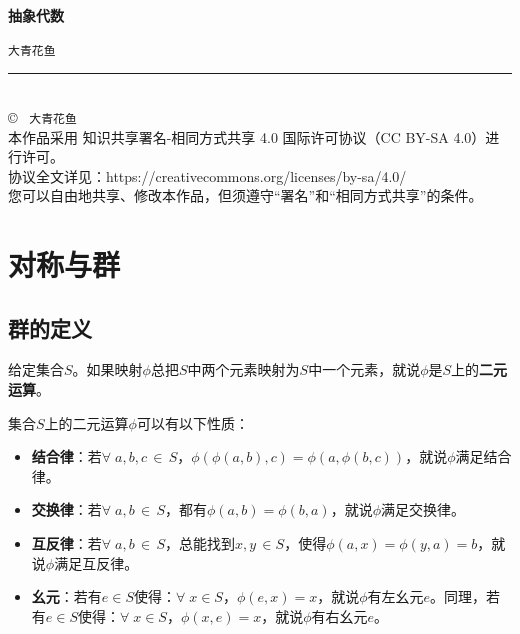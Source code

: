 \documentclass[12pt,UTF8,fontset=none]{ctexbook}
\newcommand{\mytitle}{抽象代数}
\newcommand{\myauthor}{大青花鱼}
\begin{document}
\cleardoublepage                %
\thispagestyle{empty}           %
\begin{center}
    \vspace*{2cm}               %
    
    { \bfseries \mytitle}
    
    \vspace{1cm}              %
    
    { \texttt{\myauthor}}
    
    \vfill                      %
    
    \rule{0.5\textwidth}{0.4pt} \\[0.5cm]
    
    {\scriptsize
    \copyright\ \the\year{} \texttt{\myauthor} \\[0.2cm]
    本作品采用 知识共享署名-相同方式共享 4.0 国际许可协议（CC BY-SA 4.0）进行许可。\\
    协议全文详见：https://creativecommons.org/licenses/by-sa/4.0/ \\
    您可以自由地共享、修改本作品，但须遵守“署名”和“相同方式共享”的条件。
    }
\end{center}
\newpage   

\tableofcontents
\newpage

\chapter{对称与群}

\section{群的定义}

\begin{df}
    给定集合$S$。如果映射$\phi$总把$S$中两个元素映射为$S$中一个元素，就说$\phi$是$S$上的\textbf{二元运算}。
\end{df}

\begin{df}
    集合$S$上的二元运算$\phi$可以有以下性质：
    \begin{itemize}
        \item \textbf{结合律}：若$\forall\; a, b, c\, \in\, S$，$\phi(\phi(a,b),c) = \phi(a,\phi(b,c))$，就说$\phi$满足结合律。
        \item \textbf{交换律}：若$\forall\; a, b\, \in\, S$，都有$\phi(a,b) = \phi(b,a)$，就说$\phi$满足交换律。
        \item \textbf{互反律}：若$\forall\; a, b\, \in\, S$，总能找到$x, y\, \in S$，使得$\phi(a, x) = \phi(y, a) = b$，就说$\phi$满足互反律。
        \item \textbf{幺元}：若有$e\in S$使得：$\forall\; x\in S$，$\phi(e,x) = x$，就说$\phi$有左幺元$e$。同理，若有$e\in S$使得：$\forall\; x\in S$，$\phi(x,e) = x$，就说$\phi$有右幺元$e$。
    \end{itemize}
\end{df}
\end{document}
